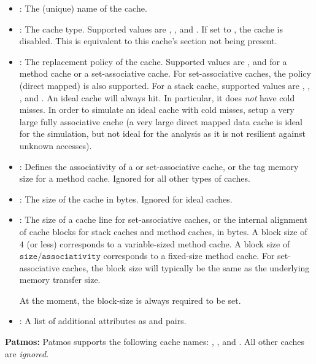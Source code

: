 \begin{itemize}
  \begin{itemize}
  \item {}: The (unique) name of the cache.
  \item {}: The cache type. Supported values are , ,  and .
  If set to , the cache is disabled. This is equivalent to this cache's section not being present.
  \item {}: The replacement policy of the cache. Supported values are ,  and
     for a method cache or a set-associative cache. For set-associative caches, the policy  (direct
    mapped) is also supported. For a stack cache, supported values are , , ,
     and .
    An ideal cache will always hit. In particular, it does \emph{not} have cold misses. In order to simulate an ideal
    cache with cold misses, setup a very large fully associative cache (a very large direct mapped data cache is ideal for
    the simulation, but not ideal for the analysis as it is not resilient against unknown accesses).
  \item {}: Defines the associativity of a  or  set-associative cache, or the 
    tag memory size for a method cache. Ignored for all other types of caches.
  \item {}: The size of the cache in bytes. Ignored for ideal caches.
  \item {}: The size of a cache line for set-associative caches, or the internal alignment of cache
    blocks for stack caches and method caches, in bytes. A block size of $4$ (or less) corresponds to a
    variable-sized method cache. A block size of $\texttt{size}/\texttt{associativity}$ corresponds to a fixed-size
    method cache. For set-associative caches, the block size will typically be the same as the underlying memory 
    transfer size. 

    At the moment, the block-size is always required to be set.
  \item {}: A list of additional attributes as  and  pairs.
  \end{itemize}

  \begin{framed}
  \textbf{Patmos:} Patmos supports the following cache names: , ,  and 
    . All other caches are \emph{ignored}.
    

\end{framed}
\end{itemize}

